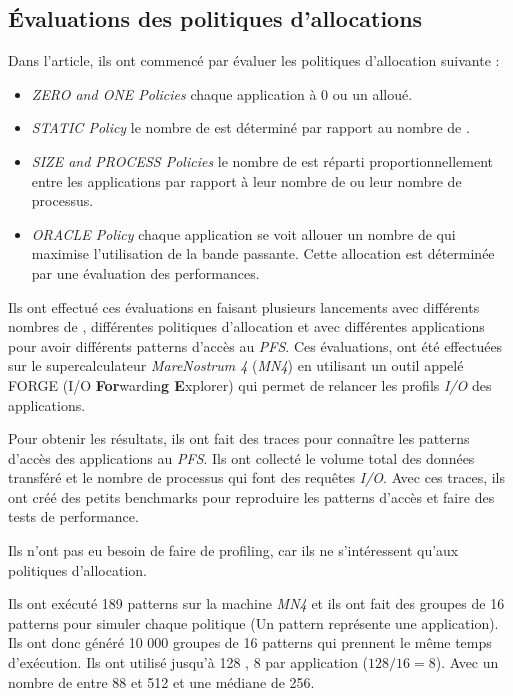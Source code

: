 \documentclass[10pt, a4paper]{article}
\begin{document}
\subsection{Évaluations des politiques d'allocations}

Dans l'article, ils ont commencé par évaluer les politiques d'allocation suivante :
\begin{itemize}
  \item \emph{ZERO and ONE Policies} chaque application à 0 ou un \noeudIO{} alloué.
  \item \emph{STATIC Policy} le nombre de \noeudsIO{} est déterminé par rapport au nombre de \noeudsDeCalculs{}.
  \item \emph{SIZE and PROCESS Policies} le nombre de \noeudsIO{} est réparti proportionnellement entre les applications par rapport à leur nombre de \noeudsDeCalculs{} ou leur nombre de processus.
  \item \emph{ORACLE Policy} chaque application se voit allouer un nombre de \noeudsIO{} qui maximise l'utilisation de la bande passante. Cette allocation est déterminée par une évaluation des performances.
\end{itemize}

Ils ont effectué ces évaluations en faisant plusieurs lancements avec différents nombres de \noeudsIO, différentes politiques d'allocation et avec différentes applications pour avoir différents patterns d'accès au \emph{PFS}. Ces évaluations, ont été effectuées sur le supercalculateur \emph{MareNostrum 4} (\emph{MN4}) en utilisant un outil appelé FORGE (I/O \textbf{For}wardin\textbf{g E}xplorer) qui permet de relancer les profils \emph{I/O} des applications.

Pour obtenir les résultats, ils ont fait des traces pour connaître les patterns d'accès des applications au \emph{PFS}. Ils ont collecté le volume total des données transféré et le nombre de processus qui font des requêtes \emph{I/O}. Avec ces traces, ils ont créé des petits benchmarks pour reproduire les patterns d'accès et faire des tests de performance.

Ils n'ont pas eu besoin de faire de profiling, car ils ne s'intéressent qu'aux politiques d'allocation.

Ils ont exécuté 189 patterns sur la machine \emph{MN4} et ils ont fait des groupes de 16 patterns pour simuler chaque politique (Un pattern représente une application).
Ils ont donc généré 10 000 groupes de 16 patterns qui prennent le même temps d'exécution.
Ils ont utilisé jusqu'à 128 \noeudsIOforwarding{}, 8 par application ($128/16=8$). Avec un nombre de \noeudsDeCalculs{} entre 88 et 512 et une médiane de 256.
\end{document}
